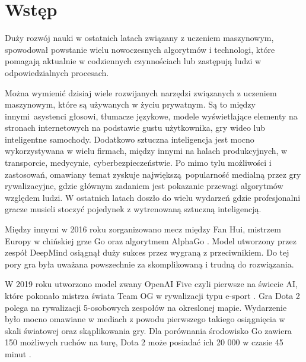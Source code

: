 \documentclass[12pt,oneside,a4paper]{report}
\begin{document}
\chapter{Wstęp}

Duży rozwój nauki w ostatnich latach związany z uczeniem maszynowym, spowodował powstanie wielu
nowoczesnych algorytmów i technologi, które pomagają aktualnie w codziennych czynnościach lub 
zastępują ludzi w odpowiedzialnych procesach. 

Można wymienić dzisiaj wiele rozwijanych narzędzi związanych z uczeniem maszynowym, które
są używanych w życiu
prywatnym. Są to między innymi asystenci głosowi, tłumacze językowe, modele wyświetlające elementy na
stronach internetowych na podstawie gustu użytkownika, gry wideo lub inteligentne samochody.
Dodatkowo sztuczna inteligencja jest mocno wykorzystywana w wielu firmach, między 
innymi na halach produkcyjnych, w transporcie, medycynie, cyberbezpieczeństwie. 
Po mimo tylu możliwości i zastosowań, omawiany temat zyskuje największą popularność
medialną przez gry rywalizacyjne, gdzie głównym zadaniem jest pokazanie przewagi algorytmów względem
ludzi. W ostatnich latach doszło do wielu wydarzeń gdzie profesjonalni gracze 
musieli stoczyć pojedynek z wytrenowaną sztuczną inteligencją. 


Między innymi w 2016 roku zorganizowano
mecz między Fan Hui, mistrzem Europy w chińskiej grze Go oraz algorytmem AlphaGo \cite{Go}.
Model utworzony przez zespół DeepMind osiągnął duży sukces przez wygraną z przeciwnikiem.
Do tej pory gra była uważana powszechnie za skomplikowaną i trudną do rozwiązania.

W 2019 roku utworzono model zwany OpenAI Five czyli pierwsze na świecie AI, które pokonało
mistrza świata Team OG w rywalizacji typu e-sport \cite{Dota2}. Gra Dota 2 polega na rywalizacji 5-osobowych
zespołów na okreslonej mapie.
Wydarzenie było mocno omawiane w mediach z powodu pierwszego takiego osiągnięcia w skali światowej
oraz skąplikowania gry. 
Dla porównania środowisko Go zawiera 150 możliwych ruchów na turę, Dota 2
może posiadać ich 20 000 w czasie 45 minut \cite{Dota2}.
\end{document}
